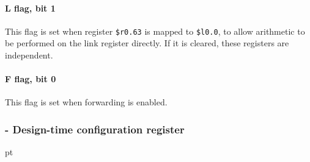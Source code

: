 \paragraph*{L flag, bit 1}
This flag is set when register \texttt{\$r0.63} is mapped to \texttt{\$l0.0}, to
allow arithmetic to be performed on the link register directly. If it is
cleared, these registers are independent.
\paragraph*{F flag, bit 0}
This flag is set when forwarding is enabled.
\subsubsection[CR\_DCFG - Design-time configuration register]{ - Design-time configuration register}
\label{reg:DCFG}
 pt\relax\noindent\footnotesize
